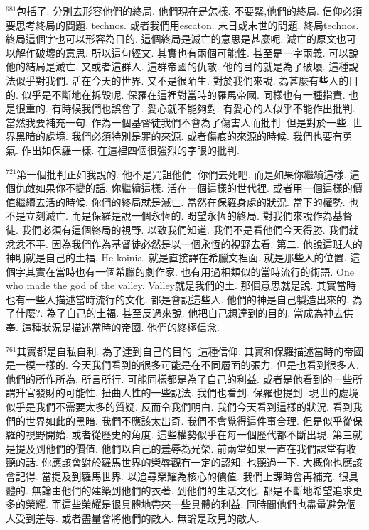 \documentclass{book}
\begin{document}
$^{681}$包括了.
分別去形容他們的終局.
他們現在是怎樣.
不要緊,他們的終局.
信仰必須要思考終局的問題.
technos.
或者我們用escaton.
末日或末世的問題.
終局technos.
終局這個字也可以形容為目的.
這個終局是滅亡的意思是甚麼呢.
滅亡的原文也可以解作破壞的意思.
所以這句經文.
其實也有兩個可能性.
甚至是一字兩義.
可以說他的結局是滅亡.
又或者這群人.
這群帝國的仇敵.
他的目的就是為了破壞.
這種說法似乎對我們.
活在今天的世界.
又不是很陌生.
對於我們來說.
為甚麼有些人的目的.
似乎是不斷地在拆毀呢.
保羅在這裡對當時的羅馬帝國.
同樣也有一種指責.
也是很重的.
有時候我們也誤會了.
愛心就不能夠對.
有愛心的人似乎不能作出批判.
當然我要補充一句.
作為一個基督徒我們不會為了傷害人而批判.
但是對於一些.
世界黑暗的處境.
我們必須特別是罪的來源.
或者傷痕的來源的時候.
我們也要有勇氣.
作出如保羅一樣.
在這裡四個很強烈的字眼的批判.

$^{721}$第一個批判正如我說的.
他不是咒詛他們.
你們去死吧.
而是如果你繼續這樣.
這個仇敵如果你不變的話.
你繼續這樣.
活在一個這樣的世代裡.
或者用一個這樣的價值繼續去活的時候.
你們的終局就是滅亡.
當然在保羅身處的狀況.
當下的權勢.
也不是立刻滅亡.
而是保羅是說一個永恆的.
盼望永恆的終局.
對我們來說作為基督徒.
我們必須有這個終局的視野.
以致我們知道.
我們不是看他們今天得勝.
我們就忿忿不平.
因為我們作為基督徒必然是以一個永恆的視野去看.
第二.
他說這班人的神明就是自己的土福.
He koinia.
就是直接譯在希臘文裡面.
就是那些人的位置.
這個字其實在當時也有一個希臘的劇作家.
也有用過相類似的當時流行的術語.
One who made the god of the valley.
Valley就是我們的土.
那個意思就是說.
其實當時也有一些人描述當時流行的文化.
都是會說這些人.
他們的神是自己製造出來的.
為了什麼?.
為了自己的土福.
甚至反過來說.
他把自己想達到的目的.
當成為神去供奉.
這種狀況是描述當時的帝國.
他們的終極信念.

$^{761}$其實都是自私自利.
為了達到自己的目的.
這種信仰.
其實和保羅描述當時的帝國是一模一樣的.
今天我們看到的很多可能是在不同層面的張力.
但是也看到很多人.
他們的所作所為.
所言所行.
可能同樣都是為了自己的利益.
或者是他看到的一些所謂升官發財的可能性.
扭曲人性的一些說法.
我們也看到.
保羅也提到.
現世的處境.
似乎是我們不需要太多的質疑.
反而令我們明白.
我們今天看到這樣的狀況.
看到我們的世界如此的黑暗.
我們不應該太出奇.
我們不會覺得這件事合理.
但是似乎從保羅的視野開始.
或者從歷史的角度.
這些權勢似乎在每一個歷代都不斷出現.
第三就是提及到他們的價值.
他們以自己的羞辱為光榮.
前兩堂如果一直在我們課堂有收聽的話.
你應該會對於羅馬世界的榮辱觀有一定的認知.
也聽過一下.
大概你也應該會記得.
當提及到羅馬世界.
以追尋榮耀為核心的價值.
我們上課時會再補充.
很具體的.
無論由他們的建築到他們的衣著.
到他們的生活文化.
都是不斷地希望追求更多的榮耀.
而這些榮耀是很具體地帶來一些具體的利益.
同時間他們也盡量避免個人受到羞辱.
或者盡量會將他們的敵人.
無論是政見的敵人.
\end{document}
